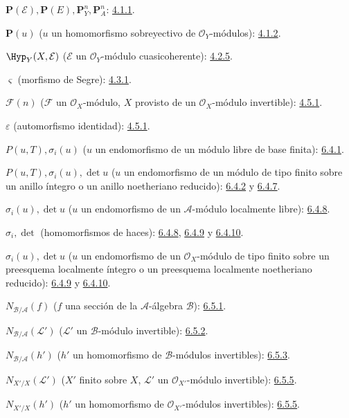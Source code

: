 \documentclass[oneside,10pt]{amsart}
\begin{document}
$\mathbf{P}(\mathcal{E}),\mathbf{P}(E),\mathbf{P}_Y^n,\mathbf{P}_A^n$: \hyperref[II.4.1.1-fr]{4.1.1}.

$\mathbf{P}(u)$ ($u$ un homomorfismo sobreyectivo de $\mathcal{O}_Y$-módulos): \hyperref[II.4.1.2-fr]{4.1.2}.

$\Hyp_Y(X,\mathcal{E})$ ($\mathcal{E}$ un $\mathcal{O}_Y$-módulo cuasicoherente): \hyperref[II.4.2.5-fr]{4.2.5}.

$\varsigma$ (morfismo de Segre): \hyperref[II.4.3.1-fr]{4.3.1}.

$\mathcal{F}(n)$ ($\mathcal{F}$ un $\mathcal{O}_X$-módulo, $X$ provisto de un
$\mathcal{O}_X$-módulo invertible): \hyperref[II.4.5.1-fr]{4.5.1}.

$\varepsilon$ (automorfismo identidad): \hyperref[II.4.5.1-fr]{4.5.1}.

$P(u,T),\sigma_i(u)$ ($u$ un endomorfismo de un módulo libre de base finita): \hyperref[II.6.4.1-fr]{6.4.1}.

$P(u,T),\sigma_i(u),\det u$
($u$ un endomorfismo de un módulo de tipo finito sobre un anillo íntegro o un
anillo noetheriano reducido): \hyperref[II.6.4.2-fr]{6.4.2} y \hyperref[II.6.4.7-fr]{6.4.7}.

$\sigma_i(u),\det u$ ($u$ un endomorfismo de un $\mathcal{A}$-módulo localmente libre): \hyperref[II.6.4.8-fr]{6.4.8}.

$\sigma_i,\det$ (homomorfismos de haces): \hyperref[II.6.4.8-fr]{6.4.8}, \hyperref[II.6.4.9-fr]{6.4.9} y \hyperref[II.6.4.10-fr]{6.4.10}.

$\sigma_i(u),\det u$
($u$ un endomorfismo de un $\mathcal{O}_X$-módulo de tipo finito sobre un preesquema
localmente íntegro o un preesquema localmente noetheriano reducido):
\hyperref[II.6.4.9-fr]{6.4.9} y \hyperref[II.6.4.10-fr]{6.4.10}.

$N_{\mathcal{B}/\mathcal{A}}(f)$
($f$ una sección de la $\mathcal{A}$-álgebra $\mathcal{B}$): \hyperref[II.6.5.1-fr]{6.5.1}.

$N_{\mathcal{B}/\mathcal{A}}(\mathcal{L}')$
($\mathcal{L}'$ un $\mathcal{B}$-módulo invertible): \hyperref[II.6.5.2-fr]{6.5.2}.

$N_{\mathcal{B}/\mathcal{A}}(h')$
($h'$ un homomorfismo de $\mathcal{B}$-módulos invertibles): \hyperref[II.6.5.3-fr]{6.5.3}.

$N_{X'/X}(\mathcal{L}')$
($X'$ finito sobre $X$, $\mathcal{L}'$ un $\mathcal{O}_{X'}$-módulo invertible): \hyperref[II.6.5.5-fr]{6.5.5}.

$N_{X'/X}(h')$
($h'$ un homomorfismo de $\mathcal{O}_{X'}$-módulos invertibles): \hyperref[II.6.5.5-fr]{6.5.5}.
\end{document}
